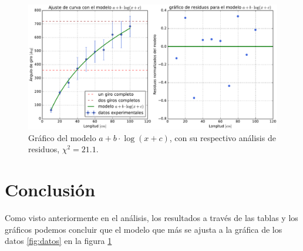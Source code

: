 \documentclass[11pt]{article}
\begin{document}
\begin{figure}[ht]
    \centering
    \includegraphics[scale=0.5]{Informe/img/grafico-modelo-alogb.pdf}
    \caption{Gráfico del modelo $a + b \cdot \log(x + c)$, con su respectivo análisis de residuos, $\chi^2 = 21.1$.}
    \label{fig:alogb}
\end{figure}

\section{Conclusión}
Como visto anteriormente en el análisis, los resultados a través de las tablas y los gráficos podemos concluir que el modelo que más se ajusta a la gráfica de los datos \ref{fig:datos} en la figura \ref{}


\pagebreak



\end{document}
